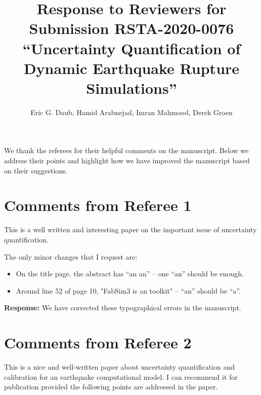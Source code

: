 \documentclass{article}
\title{Response to Reviewers for Submission RSTA-2020-0076 ``Uncertainty Quantification of Dynamic Earthquake Rupture Simulations''}
\author{Eric G. Daub, Hamid Arabnejad, Imran Mahmood, Derek Groen}
\begin{document}
\maketitle

We thank the referees for their helpful comments on the manuscript. Below
we address their points and highlight how we have improved the manuscript
based on their suggestions.

\section{Comments from Referee 1}

This is a well written and interesting paper on the important issue of uncertainty quantification.

The only minor changes that I request are:

\begin{itemize}
\item On the title page, the abstract has ``an an'' -- one ``an'' should be enough.

\item Around line 52 of page 10, "FabSim3 is an toolkit" -- ``an'' should be ``a''.
\end{itemize}
  
\textbf{Response:} We have corrected these typographical errors in the manuscript.

\section{Comments from Referee 2}

This is a nice and well-written paper about uncertainty quantification and calibration for an earthquake computational model. I can recommend it for publication provided the following points are addressed in the paper.
\end{document}
